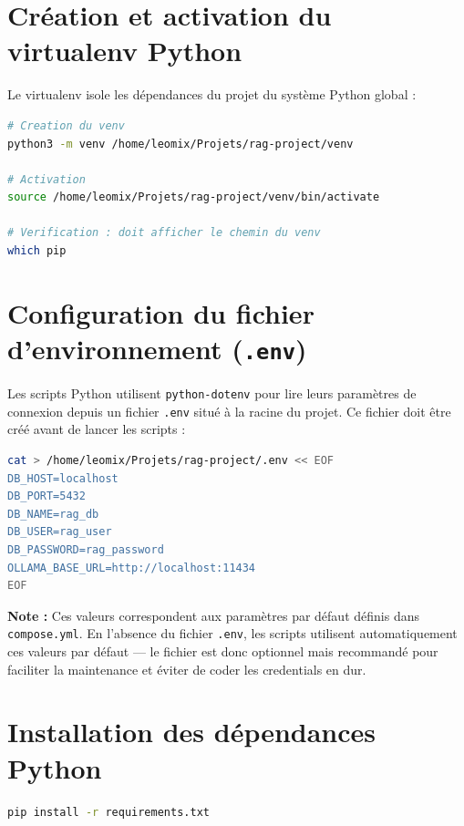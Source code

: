 \documentclass[12pt,a4paper]{report}
\begin{document}
\section{Création et activation du virtualenv Python}

Le virtualenv isole les dépendances du projet du système Python global :

\begin{lstlisting}[language=bash]
# Creation du venv
python3 -m venv /home/leomix/Projets/rag-project/venv

# Activation
source /home/leomix/Projets/rag-project/venv/bin/activate

# Verification : doit afficher le chemin du venv
which pip
\end{lstlisting}

\section{Configuration du fichier d'environnement (\texttt{.env})}

Les scripts Python utilisent \texttt{python-dotenv} pour lire leurs paramètres
de connexion depuis un fichier \texttt{.env} situé à la racine du projet.
Ce fichier doit être créé avant de lancer les scripts :

\begin{lstlisting}[language=bash]
cat > /home/leomix/Projets/rag-project/.env << EOF
DB_HOST=localhost
DB_PORT=5432
DB_NAME=rag_db
DB_USER=rag_user
DB_PASSWORD=rag_password
OLLAMA_BASE_URL=http://localhost:11434
EOF
\end{lstlisting}

\begin{infobox}
\textbf{Note :} Ces valeurs correspondent aux paramètres par défaut définis dans
\texttt{compose.yml}. En l'absence du fichier \texttt{.env}, les scripts utilisent
automatiquement ces valeurs par défaut — le fichier est donc optionnel mais recommandé
pour faciliter la maintenance et éviter de coder les credentials en dur.
\end{infobox}

\section{Installation des dépendances Python}

\begin{lstlisting}[language=bash]
pip install -r requirements.txt
\end{lstlisting}
\end{document}
